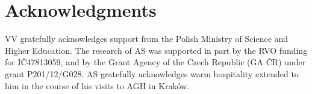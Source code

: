 \documentclass[12pt]{article}
\begin{document}








\section*{Acknowledgments}
VV gratefully acknowledges support from the Polish Ministry of Science
and Higher Education. The research of AS was supported in part by the RVO funding for
I\v{C}47813059, and by the Grant Agency of the Czech Republic (GA \v{C}R)
under grant P201/12/G028. AS gratefully acknowledges warm hospitality extended to him in the course of his visits to AGH in Krak\'ow.
\end{document}
